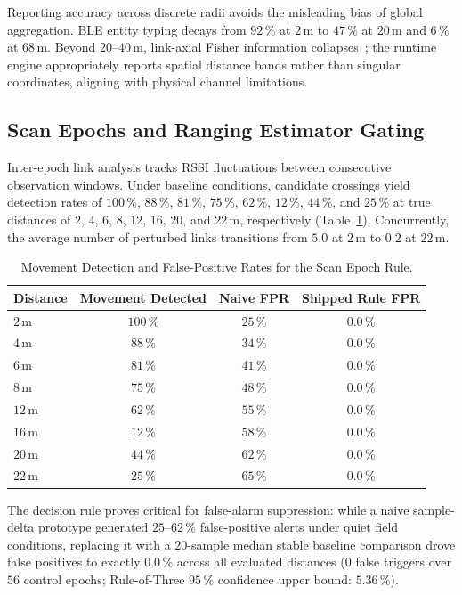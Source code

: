 \documentclass[journal,10pt]{IEEEtran}
\begin{document}
Reporting accuracy across discrete radii avoids the misleading bias of global aggregation. BLE entity typing decays from $92\,\%$ at $2$\,m to $47\,\%$ at $20$\,m and $6\,\%$ at $68$\,m. Beyond $20$--$40$\,m, link-axial Fisher information collapses~\cite{li2024}; the runtime engine appropriately reports spatial distance bands rather than singular coordinates, aligning with physical channel limitations.

\subsection{Scan Epochs and Ranging Estimator Gating}
Inter-epoch link analysis tracks RSSI fluctuations between consecutive observation windows. Under baseline conditions, candidate crossings yield detection rates of $100\,\%$, $88\,\%$, $81\,\%$, $75\,\%$, $62\,\%$, $12\,\%$, $44\,\%$, and $25\,\%$ at true distances of $2$, $4$, $6$, $8$, $12$, $16$, $20$, and $22$\,m, respectively (Table~\ref{tab:epoch}). Concurrently, the average number of perturbed links transitions from $5.0$ at $2$\,m to $0.2$ at $22$\,m.

\begin{table}[htb!]
  \centering
  \caption{Movement Detection and False-Positive Rates for the Scan Epoch Rule.}
  \label{tab:epoch}
  \footnotesize
  \begin{tabular}{@{}lccc@{}}
    \toprule
    Distance & Movement Detected & Naive FPR & Shipped Rule FPR \\
    \midrule
    $2$\,m  & $100\,\%$ & $25\,\%$ & $\mathbf{0.0\,\%}$ \\
    $4$\,m  & $88\,\%$  & $34\,\%$ & $\mathbf{0.0\,\%}$ \\
    $6$\,m  & $81\,\%$  & $41\,\%$ & $\mathbf{0.0\,\%}$ \\
    $8$\,m  & $75\,\%$  & $48\,\%$ & $\mathbf{0.0\,\%}$ \\
    $12$\,m & $62\,\%$  & $55\,\%$ & $\mathbf{0.0\,\%}$ \\
    $16$\,m & $12\,\%$  & $58\,\%$ & $\mathbf{0.0\,\%}$ \\
    $20$\,m & $44\,\%$  & $62\,\%$ & $\mathbf{0.0\,\%}$ \\
    $22$\,m & $25\,\%$  & $65\,\%$ & $\mathbf{0.0\,\%}$ \\
    \bottomrule
  \end{tabular}
\end{table}

The decision rule proves critical for false-alarm suppression: while a naive sample-delta prototype generated $25$--$62\,\%$ false-positive alerts under quiet field conditions, replacing it with a $20$-sample median stable baseline comparison drove false positives to exactly $0.0\,\%$ across all evaluated distances ($0$ false triggers over $56$ control epochs; Rule-of-Three $95\,\%$ confidence upper bound: $5.36\,\%$).
\end{document}
